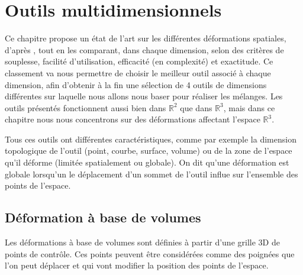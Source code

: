 
\chapter{Outils multidimensionnels}

\graphicspath{{Chapter1/Chapter1Figs/PNG/}{Chapter1/Chapter1Figs/PDF/}{Chapter1/Chapter1Figs/}}

Ce chapitre propose un état de l'art sur les différentes déformations
spatiales, d'après \cite{GB08}, tout en les comparant, dans chaque
dimension, selon des critères de souplesse, facilité d'utilisation,
efficacité (en complexité) et exactitude. Ce classement va nous
permettre de choisir le meilleur outil associé à chaque dimension,
afin d'obtenir à la fin une sélection de 4 outils de dimensions
différentes sur laquelle nous allons nous baser pour réaliser les
mélanges. Les outils présentés fonctionnent aussi bien dans
$\mathbb{R}^2$ que dans $\mathbb{R}^3$, mais dans ce chapitre nous
nous concentrons sur des déformations affectant l'espace
$\mathbb{R}^3$.

Tous ces outils ont différentes caractéristiques, comme par exemple la
dimension topologique de l'outil (point, courbe, surface, volume) ou
de la zone de l'espace qu'il déforme (limitée spatialement ou
globale). On dit qu'une déformation est globale lorsqu'un le
déplacement d'un sommet de l'outil influe sur l'ensemble des points de
l'espace.

\section{Déformation à base de volumes}
Les déformations à base de volumes sont définies à partir d'une grille
3D de points de contrôle. Ces points peuvent être considérées comme
des poignées que l'on peut déplacer et qui vont modifier la position
des points de l'espace.

